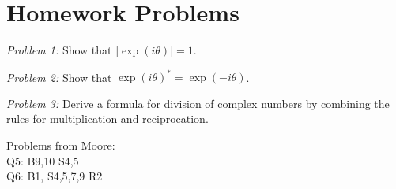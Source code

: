 \documentclass[12pt]{article}
\begin{document}
\section{Homework Problems}



\noindent
{\em Problem 1:} Show that $|\exp(i \theta)| = 1$. \\

\vskip 0.5cm

\noindent
{\em Problem 2:} Show that $\exp(i \theta)^* = \exp(-i \theta)$. \\

\vskip 0.5cm

\noindent
{\em Problem 3:} Derive a formula for division of complex numbers by combining the rules for multiplication and reciprocation.

\vskip 0.5cm

\noindent 
Problems from Moore:\\
Q5:  B9,10 S4,5\\
Q6:  B1, S4,5,7,9 R2\\
\end{document}
